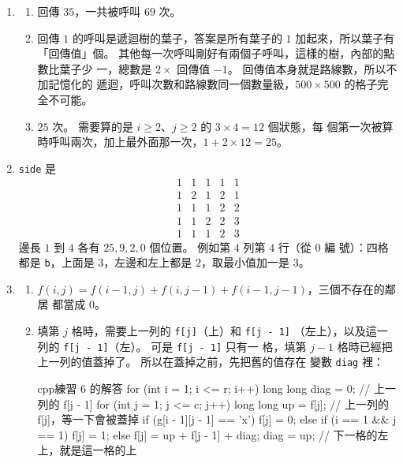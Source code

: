 \begin{enumerate}
\item
\begin{enumerate}
\item 回傳 $35$，一共被呼叫 $69$ 次。
\item 回傳 $1$ 的呼叫是遞迴樹的葉子，答案是所有葉子的 $1$ 加起來，所以葉子有
「回傳值」個。 其他每一次呼叫剛好有兩個子呼叫，這樣的樹，內部的點數比葉子少
一，總數是 $2 \times$ 回傳值 $- 1$。 回傳值本身就是路線數，所以不加記憶化的
遞迴，呼叫次數和路線數同一個數量級，$500 \times 500$ 的格子完全不可能。
\item $25$ 次。 需要算的是 $i \ge 2$、$j \ge 2$ 的 $3 \times 4 = 12$ 個狀態，每
個第一次被算時呼叫兩次，加上最外面那一次，$1 + 2 \times 12 = 25$。
\end{enumerate}

\item \texttt{side} 是
\[
\begin{matrix}
1 & 1 & 1 & 1 & 1 \\
1 & 2 & 1 & 2 & 1 \\
1 & 1 & 1 & 2 & 2 \\
1 & 1 & 2 & 2 & 3 \\
1 & 1 & 1 & 2 & 3
\end{matrix}
\]
邊長 $1$ 到 $4$ 各有 $25, 9, 2, 0$ 個位置。 例如第 $4$ 列第 $4$ 行（從 $0$ 編
號）：四格都是 \texttt{b}，上面是 $3$，左邊和左上都是 $2$，取最小值加一是
$3$。

\item
\begin{enumerate}
\item $f(i, j) = f(i - 1, j) + f(i, j - 1) + f(i - 1, j - 1)$，三個不存在的鄰居
都當成 $0$。
\item 填第 $j$ 格時，需要上一列的 \texttt{f[j]}（上）和 \texttt{f[j - 1]}
（左上），以及這一列的 \texttt{f[j - 1]}（左）。 可是 \texttt{f[j - 1]} 只有一
格，填第 $j - 1$ 格時已經把上一列的值蓋掉了。 所以在蓋掉之前，先把舊的值存在
變數 \texttt{diag} 裡：
\begin{code}{cpp}{練習 6 的解答}
for (int i = 1; i <= r; i++) {
    long long diag = 0;                   // 上一列的 f[j - 1]
    for (int j = 1; j <= c; j++) {
        long long up = f[j];     // 上一列的 f[j]，等一下會被蓋掉
        if (g[i - 1][j - 1] == 'x') {
            f[j] = 0;
        } else if (i == 1 && j == 1) {
            f[j] = 1;
        } else {
            f[j] = up + f[j - 1] + diag;
        }
        diag = up;               // 下一格的左上，就是這一格的上
    }
}
\end{code}
\end{enumerate}


\end{enumerate}
